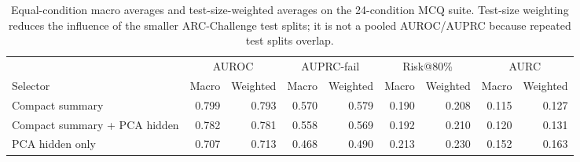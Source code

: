 \begin{table}[t]
\centering
\small
\caption{Equal-condition macro averages and test-size-weighted averages on the 24-condition MCQ suite. Test-size weighting reduces the influence of the smaller ARC-Challenge test splits; it is not a pooled AUROC/AUPRC because repeated test splits overlap.}
\label{tab:macro-weighted}
\begin{adjustbox}{width=\textwidth}
\begin{tabular}{lrrrrrrrr}
\toprule
& \multicolumn{2}{c}{AUROC} & \multicolumn{2}{c}{AUPRC-fail} & \multicolumn{2}{c}{Risk@80\%} & \multicolumn{2}{c}{AURC} \\
\cmidrule(lr){2-3}\cmidrule(lr){4-5}\cmidrule(lr){6-7}\cmidrule(lr){8-9}
Selector & Macro & Weighted & Macro & Weighted & Macro & Weighted & Macro & Weighted \\
\midrule
Compact summary & 0.799 & 0.793 & 0.570 & 0.579 & 0.190 & 0.208 & 0.115 & 0.127 \\
Compact summary + PCA hidden & 0.782 & 0.781 & 0.558 & 0.569 & 0.192 & 0.210 & 0.120 & 0.131 \\
PCA hidden only & 0.707 & 0.713 & 0.468 & 0.490 & 0.213 & 0.230 & 0.152 & 0.163 \\
\bottomrule
\end{tabular}
\end{adjustbox}
\end{table}
